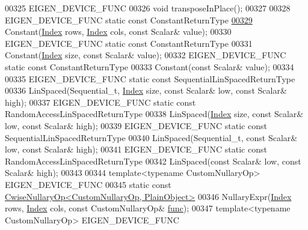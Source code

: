 \begin{DoxyCode}
00325     EIGEN\_DEVICE\_FUNC
00326     \textcolor{keywordtype}{void} transposeInPlace();
00327 
00328     EIGEN\_DEVICE\_FUNC \textcolor{keyword}{static} \textcolor{keyword}{const} ConstantReturnType
\hyperlink{group___core___module_a43d80e43aca655ed92009030f8d34976}{00329}     Constant(\hyperlink{namespace_eigen_a62e77e0933482dafde8fe197d9a2cfde}{Index} rows, \hyperlink{namespace_eigen_a62e77e0933482dafde8fe197d9a2cfde}{Index} cols, \textcolor{keyword}{const} Scalar& value);
00330     EIGEN\_DEVICE\_FUNC \textcolor{keyword}{static} \textcolor{keyword}{const} ConstantReturnType
00331     Constant(\hyperlink{namespace_eigen_a62e77e0933482dafde8fe197d9a2cfde}{Index} size, \textcolor{keyword}{const} Scalar& value);
00332     EIGEN\_DEVICE\_FUNC \textcolor{keyword}{static} \textcolor{keyword}{const} ConstantReturnType
00333     Constant(\textcolor{keyword}{const} Scalar& value);
00334 
00335     EIGEN\_DEVICE\_FUNC \textcolor{keyword}{static} \textcolor{keyword}{const} SequentialLinSpacedReturnType
00336     LinSpaced(Sequential\_t, \hyperlink{namespace_eigen_a62e77e0933482dafde8fe197d9a2cfde}{Index} size, \textcolor{keyword}{const} Scalar& low, \textcolor{keyword}{const} Scalar& high);
00337     EIGEN\_DEVICE\_FUNC \textcolor{keyword}{static} \textcolor{keyword}{const} RandomAccessLinSpacedReturnType
00338     LinSpaced(\hyperlink{namespace_eigen_a62e77e0933482dafde8fe197d9a2cfde}{Index} size, \textcolor{keyword}{const} Scalar& low, \textcolor{keyword}{const} Scalar& high);
00339     EIGEN\_DEVICE\_FUNC \textcolor{keyword}{static} \textcolor{keyword}{const} SequentialLinSpacedReturnType
00340     LinSpaced(Sequential\_t, \textcolor{keyword}{const} Scalar& low, \textcolor{keyword}{const} Scalar& high);
00341     EIGEN\_DEVICE\_FUNC \textcolor{keyword}{static} \textcolor{keyword}{const} RandomAccessLinSpacedReturnType
00342     LinSpaced(\textcolor{keyword}{const} Scalar& low, \textcolor{keyword}{const} Scalar& high);
00343 
00344     \textcolor{keyword}{template}<\textcolor{keyword}{typename} CustomNullaryOp> EIGEN\_DEVICE\_FUNC
00345     \textcolor{keyword}{static} \textcolor{keyword}{const} \hyperlink{group___core___module_class_eigen_1_1_cwise_nullary_op}{CwiseNullaryOp<CustomNullaryOp, PlainObject>}
00346     NullaryExpr(\hyperlink{namespace_eigen_a62e77e0933482dafde8fe197d9a2cfde}{Index} rows, \hyperlink{namespace_eigen_a62e77e0933482dafde8fe197d9a2cfde}{Index} cols, \textcolor{keyword}{const} CustomNullaryOp& \hyperlink{structfunc}{func});
00347     \textcolor{keyword}{template}<\textcolor{keyword}{typename} CustomNullaryOp> EIGEN\_DEVICE\_FUNC

\end{DoxyCode}
